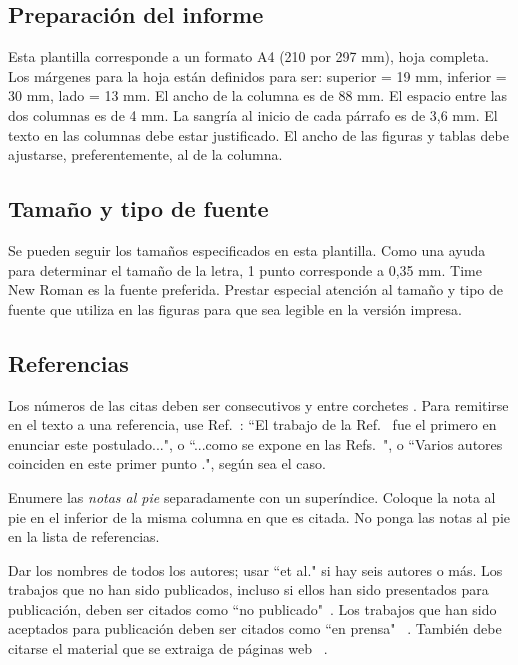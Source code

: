 \documentclass[a4paper, 10pt, conference]{ieeeconf}      %
\begin{document}
\subsection{Preparaci\'on del informe}

Esta plantilla corresponde a un formato A4 (210 por 297 mm), hoja completa. Los m\'argenes para la hoja est\'an definidos para ser: superior = 19 mm, inferior = 30 mm, lado = 13 mm. El ancho de la columna es de 88 mm.  El espacio entre las dos columnas es de 4 mm.  La sangr\'ia al inicio de cada p\'arrafo es de 3,6 mm.
El texto en las columnas debe estar justificado. El ancho de las figuras y tablas debe ajustarse, preferentemente, al de la columna.

\subsection{Tama\~no y tipo de fuente}
Se pueden seguir los tama\~nos especificados en esta plantilla. Como una ayuda para determinar el tama\~no de la letra, 1 punto corresponde a 0,35 mm.  Time New Roman es la fuente preferida. Prestar especial atenci\'on al tama\~no y tipo de fuente que utiliza en las figuras para que sea legible en la versión impresa. 

\subsection{Referencias}

Los n\'umeros de las citas deben ser consecutivos y entre corchetes \cite{c1}. Para remitirse en el texto a una referencia, use Ref.~\cite{c3}: ``El trabajo de la Ref.~\cite{c3} fue el primero en enunciar este postulado...", o ``...como se expone en las Refs.~\cite{c1,c5}", o ``Varios autores coinciden en este primer punto \cite{c1,c2,c3,c4}.", seg\'un sea el caso. 

Enumere las {\it notas al pie} separadamente con un super\'indice. Coloque la nota al pie en el inferior de la misma columna en que es citada.  No ponga las notas al pie en la lista de referencias.  

Dar los nombres de todos los autores; usar ``et al." si hay seis autores o m\'as.  Los trabajos que no han sido publicados, incluso si ellos han sido presentados para publicaci\'on, deben ser citados como ``no publicado"~\cite{c4}.  Los trabajos que han sido aceptados para publicaci\'on deben ser citados como ``en prensa" ~\cite{c5}.  Tambi\'en debe citarse el material que se extraiga de p\'aginas web ~\cite{c8}.
\end{document}
